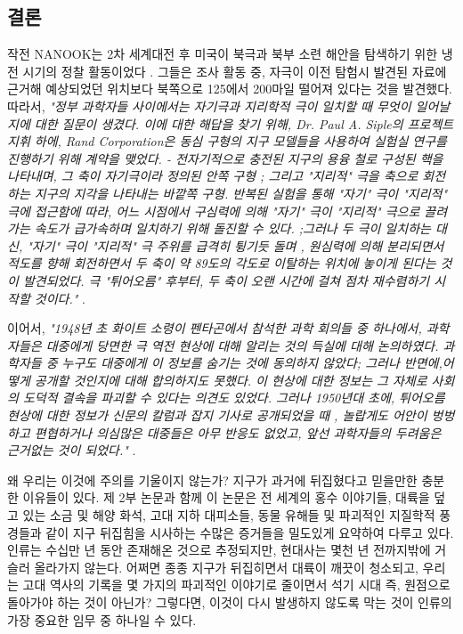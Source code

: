 \documentclass[10pt,twocolumn,letterpaper]{article}
\begin{document}
\begin{개요}
\section{결론}
작전 NANOOK는 2차 세계대전 후 미국이 북극과 북부 소련 해안을 탐색하기 위한 냉전 시기의 정찰 활동이었다 \cite{137}. 그들은 조사 활동 중, 자극이 이전 탐험시 발견된 자료에 근거해 예상되었던 위치보다 북쪽으로 125에서 200마일 떨어져 있다는 것을 발견했다. 따라서, \textit{"정부 과학자들 사이에서는 자기극과  지리학적 극이 일치할 때 무엇이 일어날지에 대한 질문이 생겼다. 이에 대한 해답을 찾기 위해, Dr. Paul A. Siple의 프로젝트 지휘 하에, Rand Corporation은 동심 구형의 지구 모델들을 사용하여  실험실 연구를 진행하기 위해 계약을 맺었다. - 전자기적으로 충전된 지구의 용융 철로 구성된 핵을 나타내며, 그 축이 자기극이라 정의된 안쪽 구형 ; 그리고 "지리적" 극을 축으로 회전하는 지구의 지각을 나타내는 바깥쪽 구형. 반복된 실험을 통해 "자기" 극이 "지리적" 극에 접근함에 따라, 어느 시점에서 구심력에 의해  "자기" 극이 "지리적" 극으로 끌려가는 속도가 급가속하며 일치하기 위해 돌진할 수 있다. ;그러나 두 극이 일치하는 대신, "자기" 극이 "지리적" 극 주위를 급격히 튕기듯 돌며 , 원심력에 의해 분리되면서 적도를 향해 회전하면서 두 축이 약 89도의 각도로 이탈하는 위치에 놓이게 된다는 것이 발견되었다. 극 "튀어오름" 후부터, 두 축이 오랜 시간에 걸쳐 점차 재수렴하기 시작할 것이다."} \cite{138,139}.

이어서, \textit{"1948년 초 화이트 소령이 펜타곤에서 참석한 과학 회의들 중 하나에서, 과학자들은 대중에게 당면한 극 역전  현상에 대해 알리는 것의 득실에 대해 논의하였다. 과학자들 중 누구도 대중에게 이 정보를 숨기는 것에 동의하지 않았다; 그러나 반면에,어떻게 공개할 것인지에 대해 합의하지도 못했다. 이 현상에 대한 정보는 그 자체로 사회의 도덕적 결속을 파괴할 수 있다는 의견도 있었다. 그러나 1950년대 초에, 튀어오름 현상에 대한 정보가 신문의 칼럼과 잡지 기사로 공개되었을 때 , 놀랍게도 어안이 벙벙하고 편협하거나 의심많은 대중들은 아무 반응도 없었고, 앞선 과학자들의 두려움은 근거없는 것이 되었다."} \cite{138,139}.

왜 우리는 이것에 주의를 기울이지 않는가? 지구가 과거에 뒤집혔다고 믿을만한  충분한 이유들이 있다. 제 2부 논문과 함께 이 논문은 전 세계의 홍수 이야기들, 대륙을 덮고 있는 소금 및 해양 화석, 고대 지하 대피소들, 동물 유해들 및 파괴적인 지질학적 풍경들과 같이 지구 뒤집힘을 시사하는 수많은 증거들을 밀도있게 요약하여 다루고 있다. 인류는 수십만 년 동안 존재해온 것으로 추정되지만, 현대사는 몇천 년 전까지밖에 거슬러 올라가지 않는다. 어쩌면 종종 지구가 뒤집히면서 대륙이 깨끗이 청소되고, 우리는 고대 역사의 기록을 몇 가지의 파괴적인 이야기로 줄이면서 석기 시대 즉, 원점으로 돌아가야 하는 것이 아닌가? 그렇다면, 이것이 다시 발생하지 않도록 막는 것이 인류의 가장 중요한 임무 중 하나일 수 있다.


\end{개요}
\end{document}
